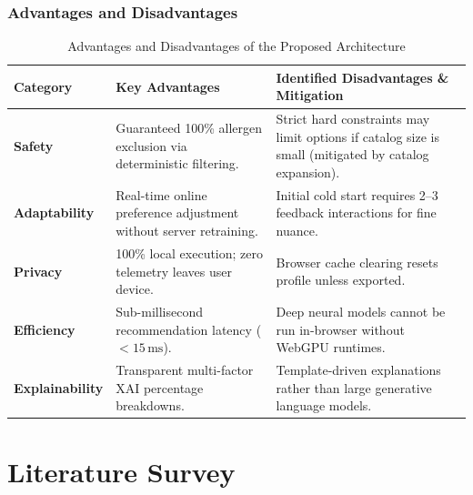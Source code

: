 \documentclass[12pt,a4paper]{report}
\begin{document}
\subsection{Advantages and Disadvantages}

\begin{table}[htbp]
\centering
\caption{Advantages and Disadvantages of the Proposed Architecture}
\label{tab:adv_disadv}
\small
\begin{tabularx}{\textwidth}{l X X}
\toprule
\textbf{Category} & \textbf{Key Advantages} & \textbf{Identified Disadvantages \& Mitigation} \\
\midrule
\textbf{Safety} & Guaranteed 100\% allergen exclusion via deterministic filtering. & Strict hard constraints may limit options if catalog size is small (mitigated by catalog expansion). \\
\textbf{Adaptability} & Real-time online preference adjustment without server retraining. & Initial cold start requires 2--3 feedback interactions for fine nuance. \\
\textbf{Privacy} & 100\% local execution; zero telemetry leaves user device. & Browser cache clearing resets profile unless exported. \\
\textbf{Efficiency} & Sub-millisecond recommendation latency ($< 15\,\text{ms}$). & Deep neural models cannot be run in-browser without WebGPU runtimes. \\
\textbf{Explainability} & Transparent multi-factor XAI percentage breakdowns. & Template-driven explanations rather than large generative language models. \\
\bottomrule
\end{tabularx}
\end{table}

\chapter{Literature Survey}
\end{document}
